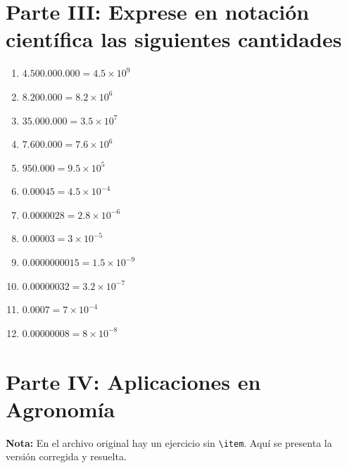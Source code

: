 \documentclass[12pt]{article}
\begin{document}
	\section*{Parte III: Exprese en notación científica las siguientes cantidades}
	
	\begin{enumerate}
		
		\item $
		4.500.000.000=4.5\times10^9
		$
		
		\item $
		8.200.000=8.2\times10^6
		$
		
		\item $
		35.000.000=3.5\times10^7
		$
		
		\item $
		7.600.000=7.6\times10^6
		$
		
		\item $
		950.000=9.5\times10^5
		$
		
		\item $
		0.00045=4.5\times10^{-4}
		$
		
		\item $
		0.0000028=2.8\times10^{-6}
		$
		
		\item $
		0.00003=3\times10^{-5}
		$
		
		\item $
		0.0000000015=1.5\times10^{-9}
		$
		
		\item $
		0.00000032=3.2\times10^{-7}
		$
		
		\item $
		0.0007=7\times10^{-4}
		$
		
		\item $
		0.00000008=8\times10^{-8}
		$
		
	\end{enumerate}
	
	\section*{Parte IV: Aplicaciones en Agronomía}
	
	\textbf{Nota:} En el archivo original hay un ejercicio sin \verb|\item|. Aquí se presenta la versión corregida y resuelta.
	
\end{document}
